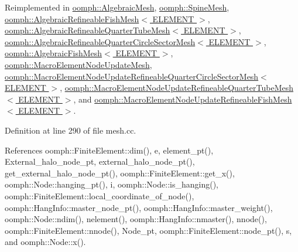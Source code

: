 Reimplemented in \hyperlink{classoomph_1_1AlgebraicMesh_ad3a5638cacb6df1a47c475bb177b6ed7}{oomph\+::\+Algebraic\+Mesh}, \hyperlink{classoomph_1_1SpineMesh_ac04a655397d61da66c155f146c698d33}{oomph\+::\+Spine\+Mesh}, \hyperlink{classoomph_1_1AlgebraicRefineableFishMesh_a8123da4b48355b39f19e0494a9d4545c}{oomph\+::\+Algebraic\+Refineable\+Fish\+Mesh$<$ E\+L\+E\+M\+E\+N\+T $>$}, \hyperlink{classoomph_1_1AlgebraicRefineableQuarterTubeMesh_af521c0a76cf0bd14692979bd7747507d}{oomph\+::\+Algebraic\+Refineable\+Quarter\+Tube\+Mesh$<$ E\+L\+E\+M\+E\+N\+T $>$}, \hyperlink{classoomph_1_1AlgebraicRefineableQuarterCircleSectorMesh_a32a096b894031167a90bafdab167ffc7}{oomph\+::\+Algebraic\+Refineable\+Quarter\+Circle\+Sector\+Mesh$<$ E\+L\+E\+M\+E\+N\+T $>$}, \hyperlink{classoomph_1_1AlgebraicFishMesh_a39cd5a86b0f762efd09f4fefba6da1c3}{oomph\+::\+Algebraic\+Fish\+Mesh$<$ E\+L\+E\+M\+E\+N\+T $>$}, \hyperlink{classoomph_1_1MacroElementNodeUpdateMesh_ab5271c4514bcd236271307361423ac9d}{oomph\+::\+Macro\+Element\+Node\+Update\+Mesh}, \hyperlink{classoomph_1_1MacroElementNodeUpdateRefineableQuarterCircleSectorMesh_a99403c711c3fdc2a601b478deebef9fe}{oomph\+::\+Macro\+Element\+Node\+Update\+Refineable\+Quarter\+Circle\+Sector\+Mesh$<$ E\+L\+E\+M\+E\+N\+T $>$}, \hyperlink{classoomph_1_1MacroElementNodeUpdateRefineableQuarterTubeMesh_a6255c22765a484ac11642ade0c084082}{oomph\+::\+Macro\+Element\+Node\+Update\+Refineable\+Quarter\+Tube\+Mesh$<$ E\+L\+E\+M\+E\+N\+T $>$}, and \hyperlink{classoomph_1_1MacroElementNodeUpdateRefineableFishMesh_a1008dd9faa50699dcef68c8c35d6979c}{oomph\+::\+Macro\+Element\+Node\+Update\+Refineable\+Fish\+Mesh$<$ E\+L\+E\+M\+E\+N\+T $>$}.



Definition at line 290 of file mesh.\+cc.



References oomph\+::\+Finite\+Element\+::dim(), e, element\+\_\+pt(), External\+\_\+halo\+\_\+node\+\_\+pt, external\+\_\+halo\+\_\+node\+\_\+pt(), get\+\_\+external\+\_\+halo\+\_\+node\+\_\+pt(), oomph\+::\+Finite\+Element\+::get\+\_\+x(), oomph\+::\+Node\+::hanging\+\_\+pt(), i, oomph\+::\+Node\+::is\+\_\+hanging(), oomph\+::\+Finite\+Element\+::local\+\_\+coordinate\+\_\+of\+\_\+node(), oomph\+::\+Hang\+Info\+::master\+\_\+node\+\_\+pt(), oomph\+::\+Hang\+Info\+::master\+\_\+weight(), oomph\+::\+Node\+::ndim(), nelement(), oomph\+::\+Hang\+Info\+::nmaster(), nnode(), oomph\+::\+Finite\+Element\+::nnode(), Node\+\_\+pt, oomph\+::\+Finite\+Element\+::node\+\_\+pt(), s, and oomph\+::\+Node\+::x().



